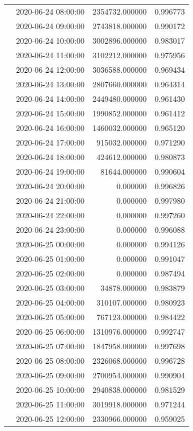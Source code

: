 \begin{tabular}{llrr}
 & 2020-06-24 08:00:00 & 2354732.000000 & 0.996773 \\
 & 2020-06-24 09:00:00 & 2743818.000000 & 0.990172 \\
 & 2020-06-24 10:00:00 & 3002896.000000 & 0.983017 \\
 & 2020-06-24 11:00:00 & 3102212.000000 & 0.975956 \\
 & 2020-06-24 12:00:00 & 3036588.000000 & 0.969434 \\
 & 2020-06-24 13:00:00 & 2807660.000000 & 0.964314 \\
 & 2020-06-24 14:00:00 & 2449480.000000 & 0.961430 \\
 & 2020-06-24 15:00:00 & 1990852.000000 & 0.961412 \\
 & 2020-06-24 16:00:00 & 1460032.000000 & 0.965120 \\
 & 2020-06-24 17:00:00 & 915032.000000 & 0.971290 \\
 & 2020-06-24 18:00:00 & 424612.000000 & 0.980873 \\
 & 2020-06-24 19:00:00 & 81644.000000 & 0.990604 \\
 & 2020-06-24 20:00:00 & 0.000000 & 0.996826 \\
 & 2020-06-24 21:00:00 & 0.000000 & 0.997980 \\
 & 2020-06-24 22:00:00 & 0.000000 & 0.997260 \\
 & 2020-06-24 23:00:00 & 0.000000 & 0.996088 \\
 & 2020-06-25 00:00:00 & 0.000000 & 0.994126 \\
 & 2020-06-25 01:00:00 & 0.000000 & 0.991047 \\
 & 2020-06-25 02:00:00 & 0.000000 & 0.987494 \\
 & 2020-06-25 03:00:00 & 34878.000000 & 0.983879 \\
 & 2020-06-25 04:00:00 & 310107.000000 & 0.980923 \\
 & 2020-06-25 05:00:00 & 767123.000000 & 0.984422 \\
 & 2020-06-25 06:00:00 & 1310976.000000 & 0.992747 \\
 & 2020-06-25 07:00:00 & 1847958.000000 & 0.997698 \\
 & 2020-06-25 08:00:00 & 2326068.000000 & 0.996728 \\
 & 2020-06-25 09:00:00 & 2700954.000000 & 0.990904 \\
 & 2020-06-25 10:00:00 & 2940838.000000 & 0.981529 \\
 & 2020-06-25 11:00:00 & 3019918.000000 & 0.971244 \\
 & 2020-06-25 12:00:00 & 2330966.000000 & 0.959025 \\

\end{tabular}
